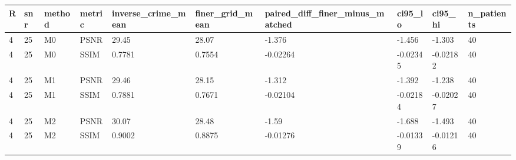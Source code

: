 \begin{tabular}{llllllllll}
\hline
R & snr & method & metric & inverse\_crime\_mean & finer\_grid\_mean & paired\_diff\_finer\_minus\_matched & ci95\_lo & ci95\_hi & n\_patients \\
\hline
4 & 25 & M0 & PSNR & 29.45 & 28.07 & -1.376 & -1.456 & -1.303 & 40 \\
4 & 25 & M0 & SSIM & 0.7781 & 0.7554 & -0.02264 & -0.02345 & -0.02182 & 40 \\
4 & 25 & M1 & PSNR & 29.46 & 28.15 & -1.312 & -1.392 & -1.238 & 40 \\
4 & 25 & M1 & SSIM & 0.7881 & 0.7671 & -0.02104 & -0.02184 & -0.02027 & 40 \\
4 & 25 & M2 & PSNR & 30.07 & 28.48 & -1.59 & -1.688 & -1.493 & 40 \\
4 & 25 & M2 & SSIM & 0.9002 & 0.8875 & -0.01276 & -0.01339 & -0.01216 & 40 \\
\hline
\end{tabular}
